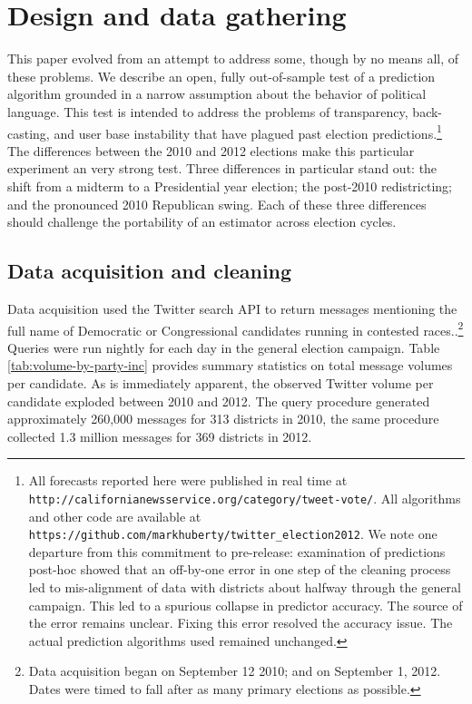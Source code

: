 \documentclass{acm_proc_article-sp}
\begin{document}
\section{Design and data gathering}
\label{sec:design-data-gath}

This paper evolved from an attempt to address some, though by no means
all, of these problems. We describe an open, fully out-of-sample test
of a prediction algorithm grounded in a narrow assumption about the
behavior of political language. This test is intended to address the
problems of transparency, back-casting, and user base instability that
have plagued past election predictions.\footnote{All forecasts reported here were published in
real time at \texttt{http://californianewsservice.org/category/tweet-vote/}.  All
algorithms and other code are available at
\texttt{https://github.com/markhuberty/twitter\_election2012}. We note one departure from this commitment to
  pre-release: examination of predictions post-hoc showed that an
  off-by-one error in one step of the cleaning process led to
  mis-alignment of data with districts about halfway through the general
  campaign. This led to a spurious collapse in predictor accuracy. The
  source of the error remains unclear. Fixing this error resolved the
  accuracy issue. The actual prediction algorithms used remained
  unchanged.} 
The differences between the 2010 and 2012 elections make this
particular experiment an very strong test. Three differences in
particular stand out: the shift from a midterm to a Presidential year
election; the post-2010 redistricting; and the pronounced 2010
Republican swing. Each of these three differences should challenge the
portability of an estimator across election cycles.

\subsection{Data acquisition and cleaning}
\label{sec:data-acquisition}

Data acquisition used the Twitter search API to return messages
mentioning the full name of Democratic or Congressional candidates
running in contested races..\footnote{Data acquisition began on September 12
2010; and on September 1, 2012. Dates were timed to fall after as many
primary elections as possible.} Queries were run nightly for each day
in the general election campaign. Table
\ref{tab:volume-by-party-inc} provides summary statistics on total
message volumes per candidate. As is immediately apparent, the observed
Twitter volume per candidate exploded between 2010 and 2012. The query
procedure generated approximately 260,000 messages for 313 districts
in 2010, the same procedure collected 1.3 million messages for 369
districts in 2012.  %
\end{document}
